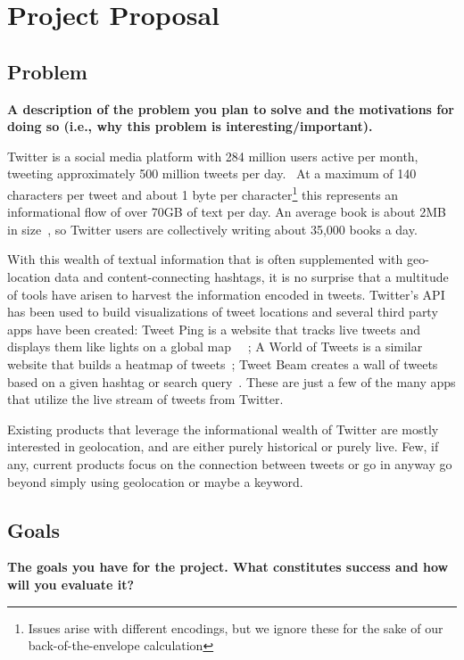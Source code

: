 \section{Project Proposal}

\subsection{Problem}
\textbf{A description of the problem you plan to solve and the motivations for doing so (i.e., why this problem is interesting/important).}

Twitter is a social media platform with 284 million users active per month, tweeting approximately 500 million tweets
per day.~\cite{twitter} At a maximum of 140 characters per tweet and about 1 byte per character\footnote{Issues arise with different
encodings, but we ignore these for the sake of our back-of-the-envelope calculation} this represents an informational
flow of over 70GB of text per day. An average book is about 2MB in size~\cite{bookfact}, so Twitter users are collectively
writing about 35,000 books a day.

With this wealth of textual information that is often supplemented with geo-location data and content-connecting hashtags,
it is no surprise that a multitude of tools have arisen to harvest the information encoded in tweets. Twitter's
API~\cite{twitterAPI} has been used to build visualizations of tweet locations and several third party apps
have been created: Tweet Ping is a website that tracks live tweets and displays them like lights on a global map~\cite{tweetping1}
~\cite{tweetping2}; A World of Tweets is a similar website that builds a heatmap of tweets~\cite{worldoftweets}; Tweet Beam
creates a wall of tweets based on a given hashtag or search query~\cite{tweetbeam}. These are just a few of the many apps that
utilize the live stream of tweets from Twitter.

Existing products that leverage the informational wealth of Twitter are mostly interested in geolocation, and are either
purely historical or purely live. Few, if any, current products focus on the connection between tweets or go in anyway go beyond
simply using geolocation or maybe a keyword.

\subsection{Goals}
\textbf{The goals you have for the project. What constitutes success and how will you evaluate it?}

